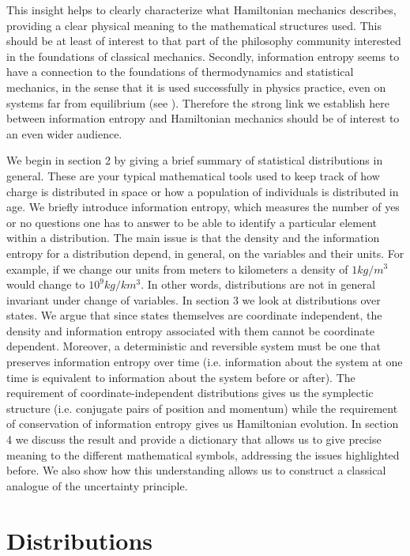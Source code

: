 \documentclass[11pt]{elsarticle}
\begin{document}
This insight helps to clearly characterize what Hamiltonian mechanics describes, providing a clear physical meaning to the mathematical structures used. This should be at least of interest to that part of the philosophy community interested in the foundations of classical mechanics. Secondly, information entropy seems to have a connection to the foundations of thermodynamics and statistical mechanics, in the sense that it is used successfully in physics practice, even on systems far from equilibrium (see \cite{Jarzynski, Maes, Horowitz}). Therefore the strong link we establish here between information entropy and Hamiltonian mechanics should be of interest to an even wider audience.

We begin in section 2 by giving a brief summary of statistical distributions in general. These are your typical mathematical tools used to keep track of how charge is distributed in space or how a population of individuals is distributed in age. We briefly introduce information entropy, which measures the number of yes or no questions one has to answer to be able to identify a particular element within a distribution. The main issue is that the density and the information entropy for a distribution depend, in general, on the variables and their units. For example, if we change our units from meters to kilometers a density of $1 kg/m^3$ would change to $10^9 kg/km^3$. In other words, distributions are not in general invariant under change of variables. In section 3 we look at distributions over states. We argue that since states themselves are coordinate independent, the density and information entropy associated with them cannot be coordinate dependent. Moreover, a deterministic and reversible system must be one that preserves information entropy over time (i.e. information about the system at one time is equivalent to information about the system before or after). The requirement of coordinate-independent distributions gives us the symplectic structure (i.e. conjugate pairs of position and momentum) while the requirement of conservation of information entropy gives us Hamiltonian evolution. In section 4 we discuss the result and provide a dictionary that allows us to give precise meaning to the different mathematical symbols, addressing the issues highlighted before. We also show how this understanding allows us to construct a classical analogue of the uncertainty principle.

\section{Distributions}
\end{document}

